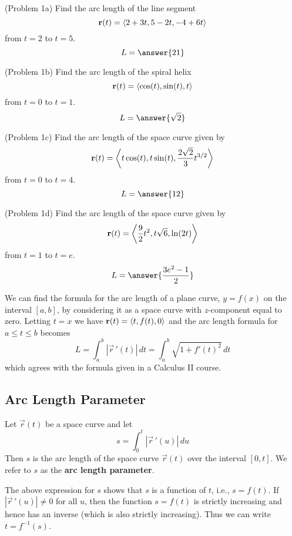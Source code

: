 \documentclass[handout]{ximera}
\begin{document}
\begin{problem}(Problem 1a)
Find the arc length of the line segment 
\[
\mathbf r(t) = \left\langle 2 + 3t, 5- 2t, -4 + 6t\right\rangle
\]
from $ t= 2$ to $t = 5$.
\[
L = \answer{21}
\]
\end{problem}


\begin{problem}(Problem 1b)
Find the arc length of the spiral helix 
\[
\mathbf r(t) = \left\langle \cos(t), \sin(t), t\right\rangle
\]
from $ t= 0$ to $t = 1$.
\[
L = \answer{\sqrt 2}
\]
\end{problem}


\begin{problem}(Problem 1c)
Find the arc length of the space curve given by
\[
\mathbf r(t) = \left\langle t\cos(t), t\sin(t), \frac{2\sqrt 2}{3} t^{3/2}\right\rangle
\]
from $ t= 0$ to $t = 4$.
\[
L = \answer{12}
\]
\end{problem}


\begin{problem}(Problem 1d)
Find the arc length of the space curve given by
\[
\mathbf r(t) = \left\langle \frac92 t^2, t\sqrt 6, \ln(2t)\right\rangle
\]
from $ t= 1$ to $t = e$.
\[
L = \answer{\frac{3e^2 -1}{2}}
\]
\end{problem}

We can find the formula for the arc length of a plane curve, $y = f(x)$ on the interval $[a,b]$, by considering it as a space curve with $z$-component equal to zero.
Letting $t = x$ we have $\mathbf r(t) = \left\langle t, f(t), 0\right\rangle$ and the arc length formula for $a \leq t \leq b$ becomes
\[
L = \int_a^b |\vec r\,'(t)| \, dt = \int_a^b \sqrt{1+ f'(t)^2} \, dt
\]
which agrees with the formula given in a Calculus II course.


\subsection{Arc Length Parameter}

Let $\vec r(t) $ be a space curve and let 
\[
s = \int_0^t |\vec r\,'(u)| \, du
\]
Then $s$ is the arc length of the space curve $\vec r(t)$ over the interval $[0, t]$.
We refer to $s$ as the \textbf{arc length parameter}.

The above expression for $s$ shows that $s$ is a function of $t$, i.e., $s = f(t)$.
If $|\vec r\,'(u)| \neq 0$ for all $u$, then the function $s = f(t)$ is strictly increasing and hence has an inverse (which is also strictly increasing).
Thus we can write $t = f^{-1}(s)$.
\end{document}
